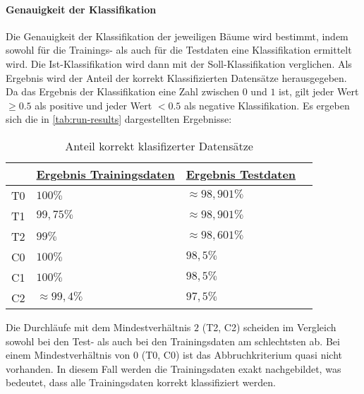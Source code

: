 \paragraph{Genauigkeit der Klassifikation}
Die Genauigkeit der Klassifikation der jeweiligen Bäume wird bestimmt,
indem sowohl für die Trainings- als auch für die Testdaten eine Klassifikation ermittelt wird.
Die Ist-Klassifikation wird dann mit der Soll-Klassifikation verglichen.
Als Ergebnis wird der Anteil der korrekt Klassifizierten Datensätze herausgegeben.
Da das Ergebnis der Klassifikation eine Zahl zwischen $0$ und $1$ ist,
gilt jeder Wert $\geq 0.5$ als positive und jeder Wert $< 0.5$ als negative Klassifikation.
Es ergeben sich die in \autoref{tab:run-results} dargestellten Ergebnisse:

\useunder{\uline}{\ul}{}
\begin{table}[h]
    \begin{center}
        \begin{tabular}{|l|l|l|l|}
        \hline
                                & {\ul \textbf{Ergebnis Trainingsdaten}} & {\ul \textbf{Ergebnis Testdaten}} \\
            \hline
            T0                  & $100\%$                                & $\approx 98,901\%$                  \\
            \hline
            T1                  & $99,75\%$                              & $\approx 98,901\%$                  \\
            \hline
            T2                  & $99\%$                                 & $\approx 98,601\%$                  \\
            \hline
            \hline
            C0                  & $100\%$                                & $98,5\%$                  \\
            \hline
            C1                  & $100\%$                                & $98,5\%$                  \\
            \hline
            C2                  & $\approx 99,4\%$                       & $97,5\%$                  \\
            \hline
        \end{tabular}
        \caption{Anteil korrekt klasifizerter Datensätze}
        \label{tab:run-results}
    \end{center}
\end{table}

Die Durchläufe mit dem Mindestverhältnis $2$ (T2, C2) scheiden im Vergleich sowohl bei den Test- als auch bei den Trainingsdaten am schlechtsten ab.
Bei einem Mindestverhältnis von $0$ (T0, C0) ist das Abbruchkriterium quasi nicht vorhanden.
In diesem Fall werden die Trainingsdaten exakt nachgebildet,
was bedeutet, dass alle Trainingsdaten korrekt klassifiziert werden.

